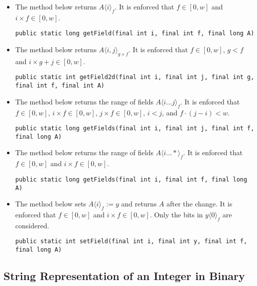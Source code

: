 \begin{itemize}
    \item
    The method below returns $A\langle i\rangle_f$. It is enforced that $f \in [0, w]$ and $i \times f \in [0, w]$.
    \begin{lstlisting}
public static long getField(final int i, final int f, final long A)
    \end{lstlisting}
    
    \item
    The method below returns $A\langle i, j \rangle_{g \times f}$. It is enforced that $f \in [0, w]$, $g < f$ and $i \times g + j \in [0, w]$.
    \begin{lstlisting}
public static int getField2d(final int i, final int j, final int g, final int f, final int A)
    \end{lstlisting}
    
    \item
    The method below returns the range of fields $A\langle i \dots j \rangle_f$. It is enforced that $f \in [0, w]$, $i \times f \in [0, w]$, $j \times f \in [0, w]$, $i < j$, and $f \cdot (j - i) < w$.
    \begin{lstlisting}
public static long getFields(final int i, final int j, final int f, final long A)
    \end{lstlisting}
    
    \item
    The method below returns the range of fields $A\langle i \dots * \rangle_f$. It is enforced that $f \in [0, w]$ and $i \times f \in [0, w]$.
    \begin{lstlisting}
public static long getFields(final int i, final int f, final long A)
    \end{lstlisting}
    
    \item
    The method below sets $A\langle i \rangle_f := y$ and returns $A$ after the change. It is enforced that $f \in [0, w]$ and $i \times f \in [0, w]$. Only the bits in $y\langle 0 \rangle_f$ are considered.
    \begin{lstlisting}
public static int setField(final int i, final int y, final int f, final long A)
    \end{lstlisting}
\end{itemize}

\subsection{String Representation of an Integer in Binary}

